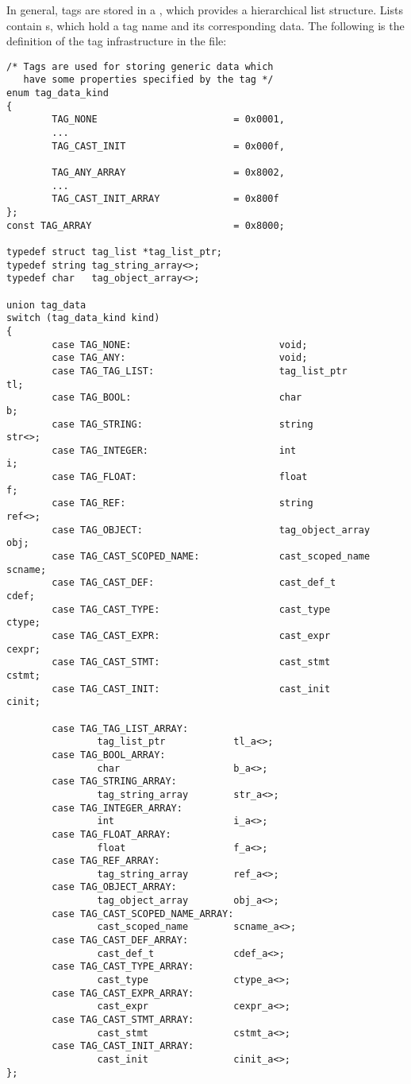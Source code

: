 In general, tags are stored in a , which provides a
hierarchical list structure.  Lists contain s, which hold a tag
name and its corresponding data.  The following is the definition of the tag
infrastructure in the \PRESC{} file:

\begin{verbatim}
/* Tags are used for storing generic data which
   have some properties specified by the tag */
enum tag_data_kind
{
        TAG_NONE                        = 0x0001,
        ...
        TAG_CAST_INIT                   = 0x000f,
        
        TAG_ANY_ARRAY                   = 0x8002,
        ...
        TAG_CAST_INIT_ARRAY             = 0x800f
};
const TAG_ARRAY                         = 0x8000;

typedef struct tag_list *tag_list_ptr;
typedef string tag_string_array<>;
typedef char   tag_object_array<>;

union tag_data
switch (tag_data_kind kind)
{
        case TAG_NONE:                          void;
        case TAG_ANY:                           void;
        case TAG_TAG_LIST:                      tag_list_ptr            tl;
        case TAG_BOOL:                          char                    b;
        case TAG_STRING:                        string                  str<>;
        case TAG_INTEGER:                       int                     i;
        case TAG_FLOAT:                         float                   f;
        case TAG_REF:                           string                  ref<>;
        case TAG_OBJECT:                        tag_object_array        obj;
        case TAG_CAST_SCOPED_NAME:              cast_scoped_name        scname;
        case TAG_CAST_DEF:                      cast_def_t              cdef;
        case TAG_CAST_TYPE:                     cast_type               ctype;
        case TAG_CAST_EXPR:                     cast_expr               cexpr;
        case TAG_CAST_STMT:                     cast_stmt               cstmt;
        case TAG_CAST_INIT:                     cast_init               cinit;
        
        case TAG_TAG_LIST_ARRAY:
                tag_list_ptr            tl_a<>;
        case TAG_BOOL_ARRAY:
                char                    b_a<>;
        case TAG_STRING_ARRAY:
                tag_string_array        str_a<>;
        case TAG_INTEGER_ARRAY:
                int                     i_a<>;
        case TAG_FLOAT_ARRAY:
                float                   f_a<>;
        case TAG_REF_ARRAY:
                tag_string_array        ref_a<>;
        case TAG_OBJECT_ARRAY:
                tag_object_array        obj_a<>;
        case TAG_CAST_SCOPED_NAME_ARRAY:
                cast_scoped_name        scname_a<>;
        case TAG_CAST_DEF_ARRAY:
                cast_def_t              cdef_a<>;
        case TAG_CAST_TYPE_ARRAY:       
                cast_type               ctype_a<>;
        case TAG_CAST_EXPR_ARRAY:
                cast_expr               cexpr_a<>;
        case TAG_CAST_STMT_ARRAY:
                cast_stmt               cstmt_a<>;
        case TAG_CAST_INIT_ARRAY:
                cast_init               cinit_a<>;
};


\end{verbatim}
